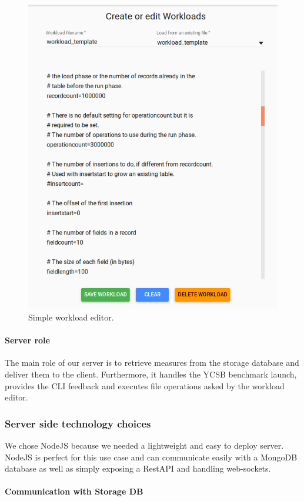 \documentclass[a4paper,11pt]{report}
\begin{document}
\begin{figure}[ht]
\begin{center}
\includegraphics[width=0.8\linewidth]{images/workload_editor.png}
\caption{Simple workload editor.}
\label{workload_editor}
\end{center}
\end{figure}
\clearpage
\paragraph{Server role}

The main role of our server is to retrieve measures from the storage database and deliver them to the client. Furthermore, it handles the YCSB benchmark launch, provides the CLI feedback and executes file operations asked by the workload editor. 

\subsubsection{Server side technology choices}

We chose NodeJS because we needed a lightweight and easy to deploy server. NodeJS is perfect for this use case and can communicate easily with a MongoDB database as well as simply exposing a RestAPI and handling web-sockets.

\paragraph{Communication with Storage DB}\label{server:mongo}
\end{document}
